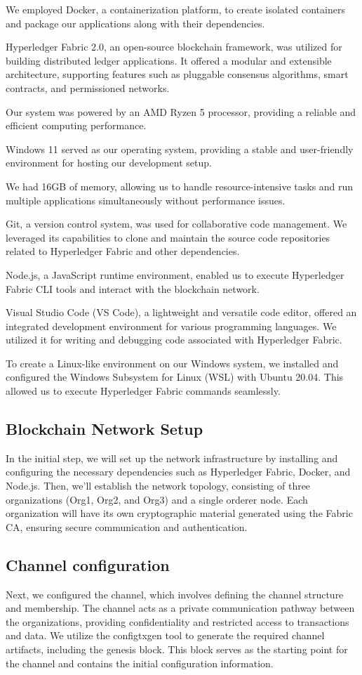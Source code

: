 We employed Docker, a containerization platform, to create isolated containers and package our applications along with their dependencies.

Hyperledger Fabric 2.0, an open-source blockchain framework, was utilized for building distributed ledger applications. It offered a modular and extensible architecture, supporting features such as pluggable consensus algorithms, smart contracts, and permissioned networks.

Our system was powered by an AMD Ryzen 5 processor, providing a reliable and efficient computing performance.

Windows 11 served as our operating system, providing a stable and user-friendly environment for hosting our development setup.

We had 16GB of memory, allowing us to handle resource-intensive tasks and run multiple applications simultaneously without performance issues.

Git, a version control system, was used for collaborative code management. We leveraged its capabilities to clone and maintain the source code repositories related to Hyperledger Fabric and other dependencies.

Node.js, a JavaScript runtime environment, enabled us to execute Hyperledger Fabric CLI tools and interact with the blockchain network.

Visual Studio Code (VS Code), a lightweight and versatile code editor, offered an integrated development environment for various programming languages. We utilized it for writing and debugging code associated with Hyperledger Fabric.

To create a Linux-like environment on our Windows system, we installed and configured the Windows Subsystem for Linux (WSL) with Ubuntu 20.04. This allowed us to execute Hyperledger Fabric commands seamlessly.
\subsection{Blockchain Network Setup}
\noindent In the initial step, we will set up the network infrastructure by installing and configuring the necessary dependencies such as Hyperledger Fabric, Docker, and Node.js. Then, we'll establish the network topology, consisting of three organizations (Org1, Org2, and Org3) and a single orderer node. Each organization will have its own cryptographic material generated using the Fabric CA, ensuring secure communication and authentication. 
\subsection{Channel configuration}
\noindent Next, we configured the channel, which involves defining the channel structure and membership. The channel acts as a private communication pathway between the organizations, providing confidentiality and restricted access to transactions and data. We utilize the configtxgen tool to generate the required channel artifacts, including the genesis block. This block serves as the starting point for the channel and contains the initial configuration information.

